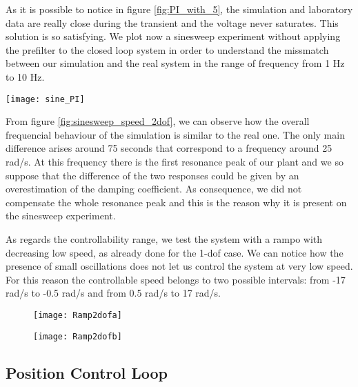 As it is possible to notice in figure \ref{fig:PI_with_5}, the simulation and laboratory data are really close during the transient and the voltage never saturates. This solution is so satisfying. We plot now a sinesweep experiment without applying the prefilter to the closed loop system in order to understand the missmatch between our simulation and the real system in the range of frequency from 1 Hz to 10 Hz.

\begin{figure*}[h]
	\centering
	\texttt{[image: sine\_PI]}
	\caption{Sineweep experiment from 1 Hz to 10 Hz in 100s}
	\label{fig:sinesweep_speed_2dof}
\end{figure*}

From figure \ref{fig:sinesweep_speed_2dof}, we can observe how the overall frequencial behaviour of the simulation is similar to the real one. The only main difference arises around 75 seconds that correspond to a frequency around 25 rad/s. At this frequency there is the first resonance peak of our plant and we so suppose that the difference of the two responses could be given by an overestimation of the damping coefficient. As consequence, we did not compensate the whole resonance peak and this is the reason why it is present on the sinesweep experiment.
\par
As regards the controllability range, we test the system with a rampo with decreasing low speed, as already done for the 1-dof case. We can notice how the presence of small oscillations does not let us control the system at very low speed. For this reason the controllable speed belongs to two possible intervals: from -17 rad/s to -0.5 rad/s and from 0.5 rad/s to 17 rad/s.
\begin{figure*}[h]
	\centering
	\begin{subfigure}{0.45\columnwidth}
		\texttt{[image: Ramp2dofa]}
	\end{subfigure}
	\begin{subfigure}{0.45\columnwidth}
		\texttt{[image: Ramp2dofb]}
	\end{subfigure}

	\caption{Ramp experiment from 17 rad/s to 0 rad/s in 100s}
	\label{fig:Ramp2dof}
\end{figure*}

\newpage
\subsection{Position Control Loop}

